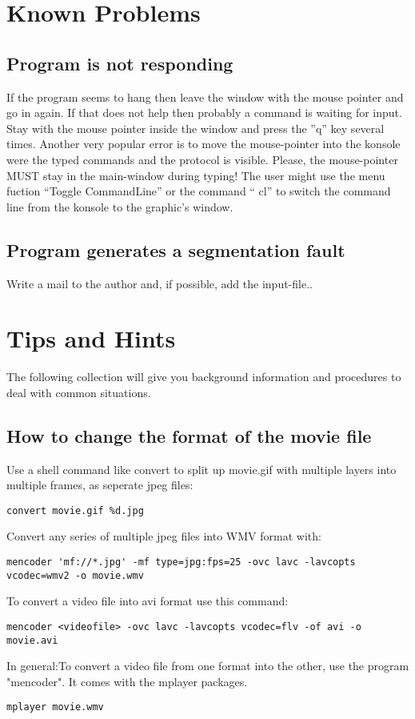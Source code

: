 \documentclass{article}
\begin{document}
\begin{appendix}
\section{\label{Known Problems}Known Problems}
\subsection{\label{Program is not responding}Program is not responding}
If the program seems to hang then leave the window with the mouse pointer and go in again. If that does not help then probably a command is waiting for input. Stay with the mouse pointer inside the window and press the ''q'' key several times. Another very popular error is to move the mouse-pointer into the konsole were the typed commands and the protocol is visible. Please, the mouse-pointer MUST stay in the main-window during typing! The user might use the menu fuction ``Toggle CommandLine'' or the command `` cl'' to switch the command line from the konsole to the graphic's window.

\subsection{\label{Program generates a segmentation fault}Program generates a segmentation fault}
Write a mail to the author and, if possible, add the input-file.\cite{cgx}.

\section{\label{Tips and Hints}Tips and Hints}
The following collection will give you background information and procedures to deal with common situations.

\subsection{\label{How to change the format of the movie file}How to change the format of the movie file}
Use a shell command like convert to split up movie.gif with multiple
layers into multiple frames, as seperate jpeg files:
\begin{verbatim}
convert movie.gif %d.jpg
\end{verbatim}
Convert any series of multiple jpeg files into WMV format with:
\begin{verbatim}
mencoder 'mf://*.jpg' -mf type=jpg:fps=25 -ovc lavc -lavcopts
vcodec=wmv2 -o movie.wmv
\end{verbatim}
To convert a video file into avi format use this command:
\begin{verbatim}
mencoder <videofile> -ovc lavc -lavcopts vcodec=flv -of avi -o movie.avi
\end{verbatim}
In general:To convert a video file from one format into the other, use
the program "mencoder". It comes with the mplayer packages. 
\begin{verbatim}
mplayer movie.wmv
\end{verbatim}


\end{appendix}
\end{document}
